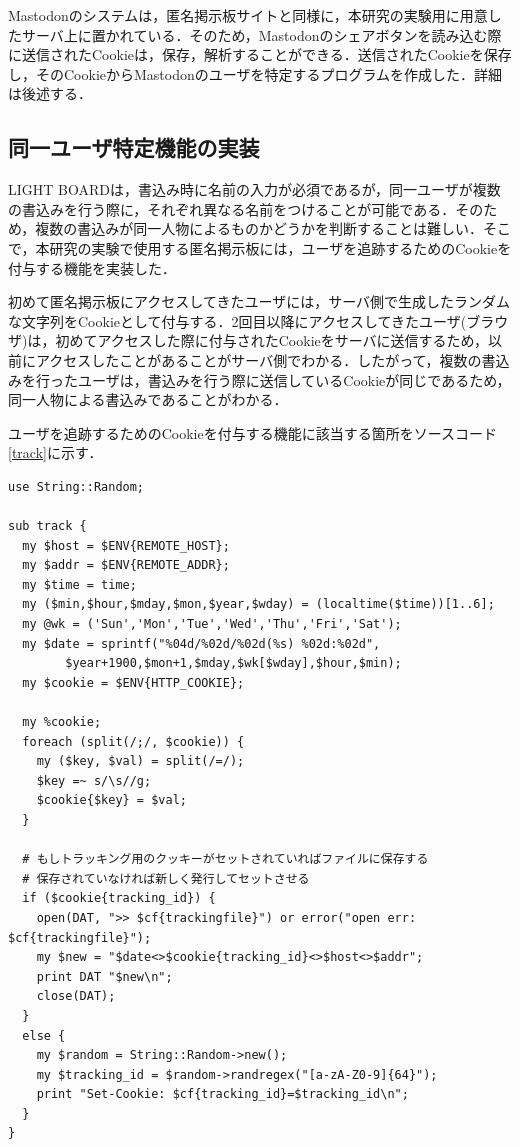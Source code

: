 \documentclass[10pt, a4paper]{jreport}
\begin{document}
Mastodonのシステムは，匿名掲示板サイトと同様に，本研究の実験用に用意したサーバ上に置かれている．そのため，Mastodonのシェアボタンを読み込む際に送信されたCookieは，保存，解析することができる．送信されたCookieを保存し，そのCookieからMastodonのユーザを特定するプログラムを作成した．詳細は後述する．

\subsection{同一ユーザ特定機能の実装}
LIGHT BOARDは，書込み時に名前の入力が必須であるが，同一ユーザが複数の書込みを行う際に，それぞれ異なる名前をつけることが可能である．そのため，複数の書込みが同一人物によるものかどうかを判断することは難しい．そこで，本研究の実験で使用する匿名掲示板には，ユーザを追跡するためのCookieを付与する機能を実装した．

初めて匿名掲示板にアクセスしてきたユーザには，サーバ側で生成したランダムな文字列をCookieとして付与する．2回目以降にアクセスしてきたユーザ(ブラウザ)は，初めてアクセスした際に付与されたCookieをサーバに送信するため，以前にアクセスしたことがあることがサーバ側でわかる．したがって，複数の書込みを行ったユーザは，書込みを行う際に送信しているCookieが同じであるため，同一人物による書込みであることがわかる．

ユーザを追跡するためのCookieを付与する機能に該当する箇所をソースコード\ref{track}に示す．

\begin{lstlisting}[caption=同一ユーザ特定機能,label=track]
use String::Random;

sub track {
  my $host = $ENV{REMOTE_HOST};
  my $addr = $ENV{REMOTE_ADDR};
  my $time = time;
  my ($min,$hour,$mday,$mon,$year,$wday) = (localtime($time))[1..6];
  my @wk = ('Sun','Mon','Tue','Wed','Thu','Fri','Sat');
  my $date = sprintf("%04d/%02d/%02d(%s) %02d:%02d",
        $year+1900,$mon+1,$mday,$wk[$wday],$hour,$min);
  my $cookie = $ENV{HTTP_COOKIE};

  my %cookie;
  foreach (split(/;/, $cookie)) {
    my ($key, $val) = split(/=/);
    $key =~ s/\s//g;
    $cookie{$key} = $val;
  }

  # もしトラッキング用のクッキーがセットされていればファイルに保存する
  # 保存されていなければ新しく発行してセットさせる
  if ($cookie{tracking_id}) {
    open(DAT, ">> $cf{trackingfile}") or error("open err: $cf{trackingfile}");
    my $new = "$date<>$cookie{tracking_id}<>$host<>$addr";
    print DAT "$new\n";
    close(DAT);
  }
  else {
    my $random = String::Random->new();
    my $tracking_id = $random->randregex("[a-zA-Z0-9]{64}");
    print "Set-Cookie: $cf{tracking_id}=$tracking_id\n";
  }
}
\end{lstlisting}
\end{document}
